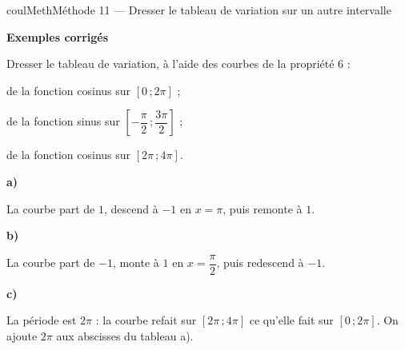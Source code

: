 \documentclass[11pt,a4paper]{article}
\makeatletter
\newcommand{\lycee@intff}[2]{\left[#1\,;#2\right]}
\providecommand{\intff}{\lycee@intff}%
\newcounter{lycee@signet}
\newcommand{\signet}[3][]{\stepcounter{lycee@signet}%
  \edef\lycee@dest{\if\relax\detokenize{#1}\relax
    signet.\arabic{lycee@signet}\else#1\fi}%
  \hypertarget{\lycee@dest}{}\bookmark[level=#2,dest=\lycee@dest]{#3}}
\newcounter{methode}
\newenvironment{methodebox}[1][Méthode]{\stepcounter{methode}%
  \begin{boitecours}[phantom={\signet[methode-\arabic{methode}]{2}{#1}}]{coulMeth}{#1}}%
  {\end{boitecours}}
\newcommand{\etape}[1]{\par\smallskip\textbf{\color{coulMeth}#1}\par\nobreak\smallskip}
\newcommand{\cas}[1]{\par\smallskip\noindent\textbf{\color{coulExo}#1}\vadjust{\nobreak}}
\newenvironment{correction}{\par}{\par}
\newcommand{\etapeexemples}{\etape{Exemples corrigés}}
\makeatother
\begin{document}
\begin{methodebox}[Méthode 11 --- Dresser le tableau de variation sur un autre intervalle]
\etapeexemples
Dresser le tableau de variation, à l'aide des courbes de la propriété 6 :
\begin{questions}[label=\alph*)]
  \item de la fonction cosinus sur $\intff{0}{2\pi}$ ;
  \item de la fonction sinus sur $\intff{-\dfrac{\pi}{2}}{\dfrac{3\pi}{2}}$ ;
  \item de la fonction cosinus sur $\intff{2\pi}{4\pi}$.
\end{questions}
\begin{correction}
\cas{a)}\par\nopagebreak
\begin{minipage}[c]{0.46\linewidth}\raggedright
La courbe part de $1$, descend à $-1$ en $x=\pi$, puis remonte à $1$.
\end{minipage}\hfill
\begin{minipage}[c]{0.50\linewidth}\centering
{}
\end{minipage}
\cas{b)}\par\nopagebreak
\begin{minipage}[c]{0.46\linewidth}\raggedright
La courbe part de $-1$, monte à $1$ en $x=\dfrac{\pi}{2}$, puis redescend à $-1$.
\end{minipage}\hfill
\begin{minipage}[c]{0.50\linewidth}\centering
{}
\end{minipage}
\cas{c)}\par\nopagebreak
\begin{minipage}[c]{0.46\linewidth}\raggedright
La période est $2\pi$ : la courbe refait sur $\intff{2\pi}{4\pi}$ ce qu'elle fait sur
$\intff{0}{2\pi}$. On ajoute $2\pi$ aux abscisses du tableau a).
\end{minipage}\hfill
\begin{minipage}[c]{0.50\linewidth}\centering
{}
\end{minipage}
\end{correction}


\end{methodebox}
\end{document}
